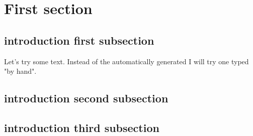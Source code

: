 \documentclass[crop=false]{standalone}
\begin{document}
\section{First section}

\subsection{introduction first subsection}
Let's try some text. Instead of the automatically generated
I will try one typed "by hand".

\subsection{introduction second subsection}

\blindtext

\subsection{introduction third subsection}

\blindtext
\end{document}
